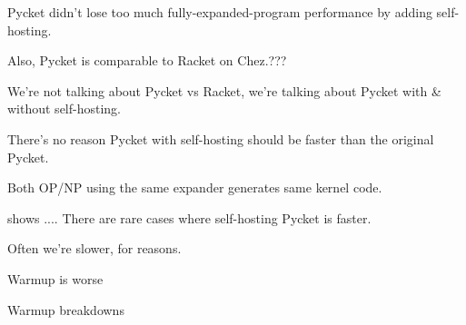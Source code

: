 		\begin{mainpoint}
				Pycket didn't lose too much fully-expanded-program performance by adding self-hosting.

				Also, Pycket is comparable to Racket on Chez.???
		\end{mainpoint}

		\begin{paragraph-here}
			We're not talking about Pycket vs Racket, we're talking about Pycket with \& without self-hosting.
		\end{paragraph-here}

		\begin{paragraph-here}
			There’s no reason Pycket with self-hosting should be faster than the original Pycket.

			Both OP/NP using the same expander generates same kernel code.
		\end{paragraph-here}


		\begin{paragraph-here}
			 shows ....
			There are rare cases where self-hosting Pycket is faster.
		\end{paragraph-here}

		\begin{paragraph-here}
			 Often we're slower, for reasons.
		\end{paragraph-here}

		\begin{paragraph-here}
			Warmup is worse
		\end{paragraph-here}

		\begin{show-experiment}
			Warmup breakdowns
		\end{show-experiment}





